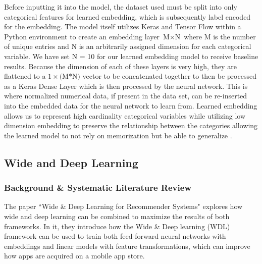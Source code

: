 \documentclass[12pt,letterpaper]{article}
\theoremstyle{plain}
\theoremstyle{definition}
\begin{document}
Before inputting it into the model, the dataset used must be split into only categorical features for learned embedding, which is subsequently label encoded for the embedding. The model itself utilizes Keras and Tensor Flow within a Python environment to create an embedding layer $\text{M} \times \text{N}$ where M is the number of unique entries and N is an arbitrarily assigned dimension for each categorical variable. We have set N = 10 for our learned embedding model to receive baseline results. Because the dimension of each of these layers is very high, they are flattened to a $1 \times \text{(M*N)}$ vector to be concatenated together to then be processed as a Keras Dense Layer which is then processed by the neural network. This is where normalized numerical data, if present in the data set, can be re-inserted into the embedded data for the neural network to learn from. Learned embedding allows us to represent high cardinality categorical variables while utilizing low dimension embedding to preserve the relationship between the categories allowing the learned model to not rely on memorization but be able to generalize \cite{cat2vec}.

\subsection{Wide and Deep Learning}

\subsubsection{Background \& Systematic Literature Review}

\hspace{\parindent}The paper ``Wide \& Deep Learning for Recommender Systems" \cite{chengwidedeep2016} explores how wide and deep learning can be combined to maximize the results of both frameworks. In it, they introduce how the Wide \& Deep learning (WDL) framework can be used to train both feed-forward neural networks with embeddings and linear models with feature transformations, which can improve how apps are acquired on a mobile app store. 
\end{document}
